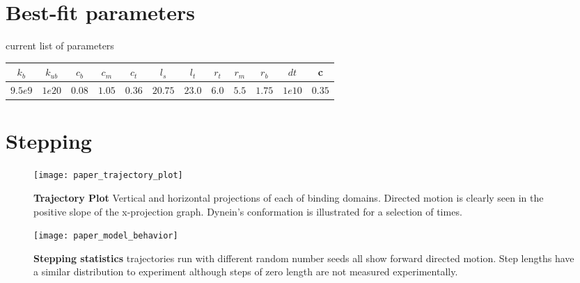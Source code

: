 

\section{Best-fit parameters}
current list of parameters
\begin{table}[]
	\begin{tabular}{c|c|c|c|c|c|c|c|c|c|c|c}
		$k_b$&  $k_{ub}$ &  $c_b$&  $c_m$& $c_t$ & $l_s$ & $l_t$ & $r_t$ & $r_m$ &$r_b$ & $dt$ & c\\
		\hline \hline
		$9.5e9$ & $1e20$ & $0.08$ & $1.05$ & $0.36$ & $20.75$ & $23.0$ & $6.0$ & $5.5$ & $1.75$ & $1e10$ & $0.35$
	\end{tabular}
\end{table}

\section{Stepping}
\begin{figure}
	\centering
	\texttt{[image: paper\_trajectory\_plot]}
	\caption{\textbf{Trajectory Plot} Vertical and horizontal projections of each of binding domains. Directed motion is clearly seen in the positive slope of the x-projection graph. Dynein's conformation is illustrated for a selection of times.}
	\label{fig:trajectory}
\end{figure}
	
	
\begin{figure}
	\centering
	\texttt{[image: paper\_model\_behavior]}
	\caption{\textbf{Stepping statistics} trajectories run with different random number seeds all show forward directed motion. Step lengths have a similar distribution to experiment although steps of zero length are not measured experimentally. }
	\label{Fig:statistics}
\end{figure}


